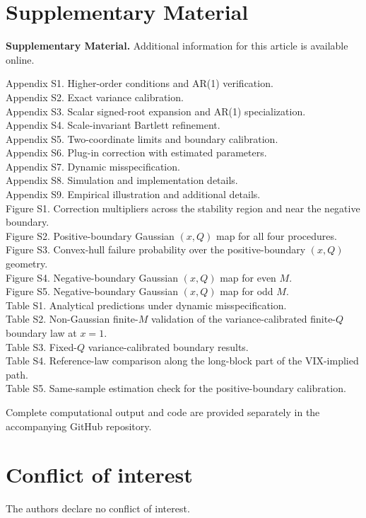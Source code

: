 \documentclass[12pt]{article}
\theoremstyle{remark}
\begin{document}
\section*{Supplementary Material}
{\small
\noindent\textbf{Supplementary Material.} Additional information for this article is available online.

\noindent Appendix S1. Higher-order conditions and AR(1) verification.\\
Appendix S2. Exact variance calibration.\\
Appendix S3. Scalar signed-root expansion and AR(1) specialization.\\
Appendix S4. Scale-invariant Bartlett refinement.\\
Appendix S5. Two-coordinate limits and boundary calibration.\\
Appendix S6. Plug-in correction with estimated parameters.\\
Appendix S7. Dynamic misspecification.\\
Appendix S8. Simulation and implementation details.\\
Appendix S9. Empirical illustration and additional details.\\
Figure S1. Correction multipliers across the stability region and near the negative boundary.\\
Figure S2. Positive-boundary Gaussian $(x,Q)$ map for all four procedures.\\
Figure S3. Convex-hull failure probability over the positive-boundary $(x,Q)$ geometry.\\
Figure S4. Negative-boundary Gaussian $(x,Q)$ map for even $M$.\\
Figure S5. Negative-boundary Gaussian $(x,Q)$ map for odd $M$.\\
Table S1. Analytical predictions under dynamic misspecification.\\
Table S2. Non-Gaussian finite-$M$ validation of the variance-calibrated finite-$Q$ boundary law at $x=1$.\\
Table S3. Fixed-$Q$ variance-calibrated boundary results.\\
Table S4. Reference-law comparison along the long-block part of the VIX-implied path.\\
Table S5. Same-sample estimation check for the positive-boundary calibration.

\noindent Complete computational output and code are provided separately in the accompanying GitHub repository.
}

\section*{Conflict of interest}
The authors declare no conflict of interest.
\end{document}
